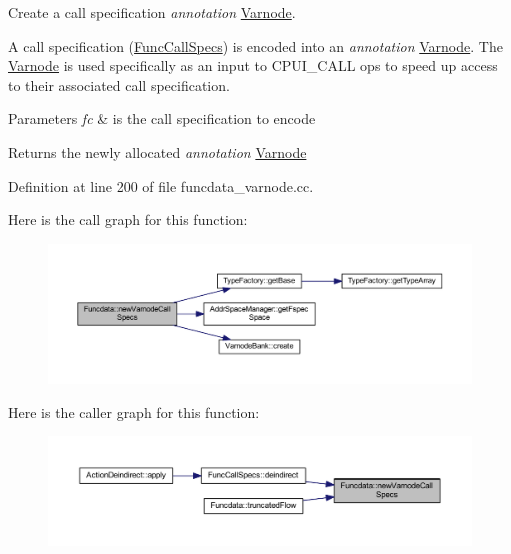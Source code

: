 Create a call specification {\itshape annotation} \mbox{\hyperlink{class_varnode}{Varnode}}. 

A call specification (\mbox{\hyperlink{class_func_call_specs}{Func\+Call\+Specs}}) is encoded into an {\itshape annotation} \mbox{\hyperlink{class_varnode}{Varnode}}. The \mbox{\hyperlink{class_varnode}{Varnode}} is used specifically as an input to C\+P\+U\+I\+\_\+\+C\+A\+LL ops to speed up access to their associated call specification. 
\begin{DoxyParams}{Parameters}
{\em fc} & is the call specification to encode \\
\hline
\end{DoxyParams}
\begin{DoxyReturn}{Returns}
the newly allocated {\itshape annotation} \mbox{\hyperlink{class_varnode}{Varnode}} 
\end{DoxyReturn}


Definition at line 200 of file funcdata\+\_\+varnode.\+cc.

Here is the call graph for this function\+:
\nopagebreak
\begin{figure}[H]
\begin{center}
\leavevmode
\includegraphics[width=350pt]{class_funcdata_a13da637294b7cae252ffc6c9e2116da2_cgraph}
\end{center}
\end{figure}
Here is the caller graph for this function\+:
\nopagebreak
\begin{figure}[H]
\begin{center}
\leavevmode
\includegraphics[width=350pt]{class_funcdata_a13da637294b7cae252ffc6c9e2116da2_icgraph}
\end{center}
\end{figure}
\mbox{\label{class_funcdata_a8ee39fe2d1f2f4702864e78dc06e6bb8}} 
